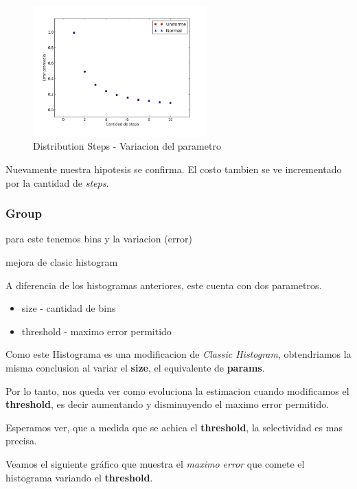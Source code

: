 \documentclass[10pt, a4paper,english,spanish,hidelinks]{article}
\begin{document}
\begin{figure}[h!]
  \centering
  \includegraphics[width=0.6\textwidth]{./imagenes/ejb2_step_parameter_variation.png}
  \caption{Distribution Steps - Variacion del parametro}
\end{figure}

Nuevamente nuestra hipotesis se confirma. El costo tambien se ve incrementado por
la cantidad de \textit{steps}.





\subsubsection{Group}

para este tenemos bins y la variacion (error)

mejora de clasic histogram

A diferencia de los histogramas anteriores, este cuenta con dos parametros.

\begin{itemize}
  \item size - cantidad de bins
  \item threshold - maximo error permitido
\end{itemize}

Como este Histograma es una modificacion de \textit{Classic Histogram}, obtendriamos la misma
conclusion al variar el \textbf{size}, el equivalente de \textbf{params}.

Por lo tanto, nos queda ver como evoluciona la estimacion cuando modificamos el
\textbf{threshold}, es decir aumentando y disminuyendo el maximo error permitido.

Esperamos ver, que a medida que se achica el \textbf{threshold}, la selectividad es mas precisa.


Veamos el siguiente gráfico que muestra el \textit{maximo error} que comete el histograma
variando el \textbf{threshold}.
\end{document}
